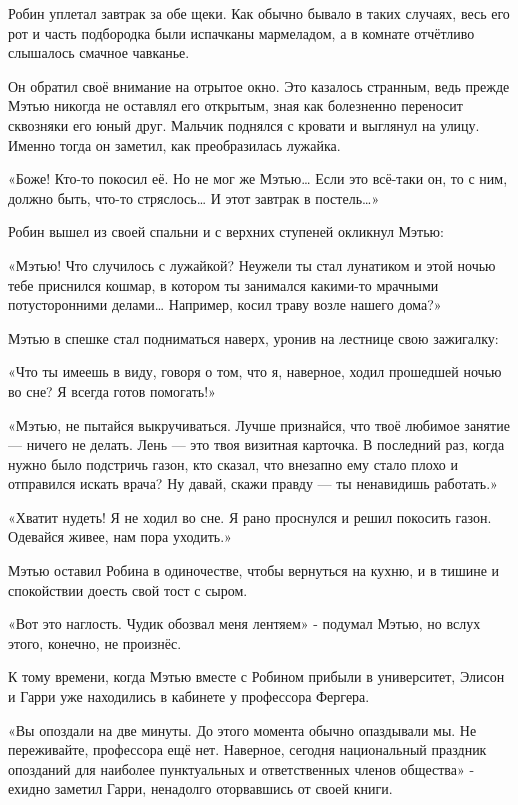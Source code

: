 \documentclass[a5paper, 9pt,
final, openany, twoside=true]{memoir}
\begin{document}
Робин уплетал завтрак за обе щеки. Как обычно бывало в таких случаях, весь его рот и часть подбородка были испачканы мармеладом, а в комнате отчётливо слышалось смачное чавканье.

Он обратил своё внимание на отрытое окно. Это казалось странным, ведь прежде Мэтью никогда не оставлял его открытым, зная как болезненно переносит сквозняки его юный друг. Мальчик поднялся с кровати и выглянул на улицу. Именно тогда он заметил, как преобразилась лужайка.

«Боже! Кто-то покосил её. Но не мог же Мэтью… Если это всё-таки он, то с ним, должно быть, что-то стряслось… И этот завтрак в постель…»

Робин вышел из своей спальни и с верхних ступеней окликнул Мэтью:

«Мэтью! Что случилось с лужайкой? Неужели ты стал лунатиком и этой ночью тебе приснился кошмар, в котором ты занимался какими-то мрачными потусторонними делами… Например, косил траву возле нашего дома?»

Мэтью в спешке стал подниматься наверх, уронив на лестнице свою зажигалку:

«Что ты имеешь в виду, говоря о том, что я, наверное, ходил прошедшей ночью во сне? Я всегда готов помогать!»

«Мэтью, не пытайся выкручиваться. Лучше признайся, что твоё любимое занятие — ничего не делать. Лень — это твоя визитная карточка. В последний раз, когда нужно было подстричь газон, кто сказал, что внезапно ему стало плохо и отправился искать врача? Ну давай, скажи правду — ты ненавидишь работать.»

«Хватит нудеть! Я не ходил во сне. Я рано проснулся и решил покосить газон. Одевайся живее, нам пора уходить.»

Мэтью оставил Робина в одиночестве, чтобы вернуться на кухню, и в тишине и спокойствии доесть свой тост с сыром.

«Вот это наглость. Чудик обозвал меня лентяем» - подумал Мэтью, но вслух этого, конечно, не произнёс.\bigskip

К тому времени, когда Мэтью вместе с Робином прибыли в университет, Элисон и Гарри уже находились в кабинете у профессора Фергера.

«Вы опоздали на две минуты. До этого момента обычно опаздывали мы. Не переживайте, профессора ещё нет. Наверное, сегодня национальный праздник опозданий для наиболее пунктуальных и ответственных членов общества» - ехидно заметил Гарри, ненадолго оторвавшись от своей книги.
\end{document}
